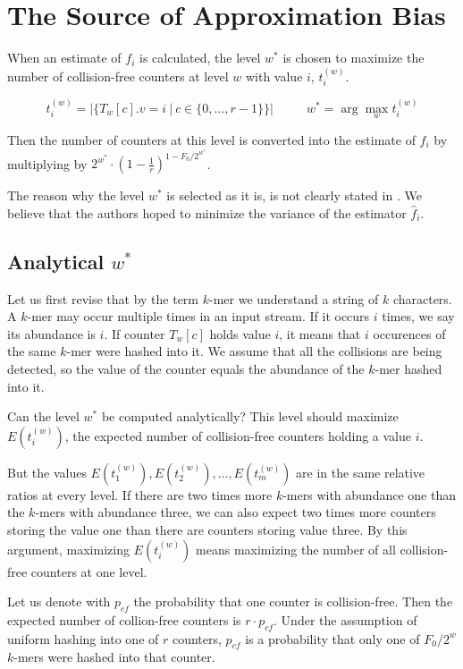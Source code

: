 \section{The Source of Approximation Bias}
\label{sec:source-of-bias}

When an estimate of $f_i$ is calculated, the level $w^*$ is chosen
to maximize the number of collision-free counters at level $w$ with value $i$, $t_i^{(w)}$. 

$$t_i^{(w)} = |\{T_w[c].v = i ~|~ c \in \{0, \dots, r-1\}\}| ~~~~~~~~~~~~ w^* = \arg\max_w t_i^{(w)}$$

Then the number of counters at this level is converted into the estimate of $f_i$ by multiplying by 
$2^{w^*} \cdot \left(1 - \frac{1}{r}\right)^{1 - F_0/2^{w^*}}$. 

The reason why the level $w^*$ is selected as it is, is not clearly stated in \cite{Sivadasan2016}. 
We believe that the authors hoped to minimize the variance of the estimator $\hat f_i$.

\subsection{Analytical $w^*$}
Let us first revise that by the term $k$-mer we understand a string of $k$ characters. A $k$-mer may occur multiple times in an input stream. 
If it occurs $i$ times, we say its abundance is $i$. If counter $T_w[c]$ holds value $i$, it means that $i$ occurences of the same $k$-mer were hashed into it.
We assume that all the collisions are being detected, so the value of the counter equals the abundance of the $k$-mer hashed into it.

Can the level $w^*$ be computed analytically? This level should maximize $E(t_i^{(w)})$, the expected number of collision-free counters holding a value $i$.

But the values $E(t_1^{(w)}), E(t_2^{(w)}), \dots, E(t_m^{(w)})$ are in the same relative ratios at every level. If there are two times more $k$-mers with
abundance one than the $k$-mers with abundance three, we can also expect two times more counters storing the value one than there are counters storing value three.
By this argument, maximizing $E(t_i^{(w)})$ means maximizing the number of all collision-free counters at one level.

Let us denote with $p_{cf}$ the probability that one counter is collision-free. Then the expected number of collion-free counters is $r \cdot p_{cf}$.
Under the assumption of uniform hashing into one of $r$ counters, $p_{cf}$ is a probability that only one of $F_0/2^w$ $k$-mers were hashed into that counter.

